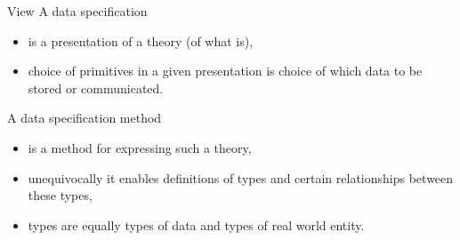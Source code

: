 \begin{frame}{View}
A data specification  
\begin{itemize}
\item is a  presentation of a theory (of what is),
\item choice of primitives in a given presentation is choice of which data to be stored or communicated.
\end{itemize}
\medskip
A data specification method 
\begin{itemize}
\item is a method for expressing such a  theory,
\item unequivocally it enables definitions of types and certain relationships between these types,
\item types are equally types of data and types of real world entity.
\end{itemize}

\end{frame}


